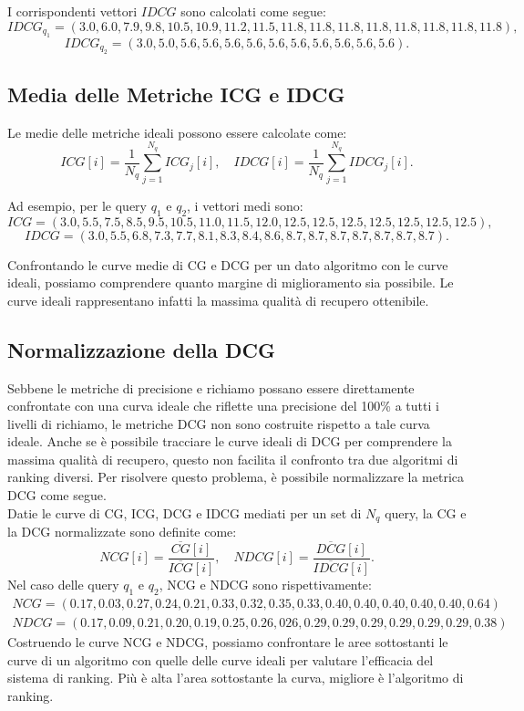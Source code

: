 \documentclass{report}
\begin{document}
	I corrispondenti vettori $IDCG$ sono calcolati come segue:
	\[
	IDCG_{q_1} = (3.0, 6.0, 7.9, 9.8, 10.5, 10.9, 11.2, 11.5, 11.8, 11.8, 11.8, 11.8, 11.8, 11.8, 11.8, 11.8),
	\]
	\[
	IDCG_{q_2} = (3.0, 5.0, 5.6, 5.6, 5.6, 5.6, 5.6, 5.6, 5.6, 5.6, 5.6, 5.6).
	\]
	
	\subsection{Media delle Metriche ICG e IDCG}
	Le medie delle metriche ideali possono essere calcolate come:
	\[
	ICG[i] = \frac{1}{N_q} \sum_{j=1}^{N_q} ICG_j[i], \quad IDCG[i] = \frac{1}{N_q} \sum_{j=1}^{N_q} IDCG_j[i].
	\]
	
	Ad esempio, per le query $q_1$ e $q_2$, i vettori medi sono:
	\[
	ICG = (3.0, 5.5, 7.5, 8.5, 9.5, 10.5, 11.0, 11.5, 12.0, 12.5, 12.5, 12.5, 12.5, 12.5, 12.5, 12.5),
	\]
	\[
	IDCG = (3.0, 5.5, 6.8, 7.3, 7.7, 8.1, 8.3, 8.4, 8.6, 8.7, 8.7, 8.7, 8.7, 8.7, 8.7, 8.7).
	\]
	
	Confrontando le curve medie di CG e DCG per un dato algoritmo con le curve ideali, possiamo comprendere quanto margine di miglioramento sia possibile. Le curve ideali rappresentano infatti la massima qualità di recupero ottenibile.
	
	\subsection{Normalizzazione della DCG}
	Sebbene le metriche di precisione e richiamo possano essere direttamente confrontate con una curva ideale che riflette una precisione del 100\% a tutti i livelli di richiamo, le metriche DCG non sono costruite rispetto a tale curva ideale. Anche se è possibile tracciare le curve ideali di DCG per comprendere la massima qualità di recupero, questo non facilita il confronto tra due algoritmi di ranking diversi. Per risolvere questo problema, è possibile normalizzare la metrica DCG come segue.
	\vspace{\baselineskip}\\
	Datie le curve di CG, ICG, DCG e IDCG mediati per un set di $N_q$ query, la CG e la DCG normalizzate sono definite come:
	\[
		NCG[i] = \frac{\overline{CG}[i]}{\overline{ICG}[i]}, \quad NDCG[i] = \frac{\overline{DCG}[i]}{\overline{IDCG}[i]}.
	\]
	Nel caso delle query $q_1$ e $q_2$, NCG e NDCG sono rispettivamente:
	\[
		\begin{array}{l}
			NCG = (0.17, 0.03, 0.27, 0.24, 0.21, 0.33, 0.32, 0.35, 0.33, 0.40, 0.40, 0.40, 0.40, 0.40, 0.64)\\
			NDCG = (0.17, 0.09, 0.21, 0.20, 0.19, 0.25, 0.26, 0
			26, 0.29, 0.29, 0.29, 0.29, 0.29, 0.29, 0.38)
		\end{array}
	\]
	Costruendo le curve NCG e NDCG, possiamo confrontare le aree sottostanti le curve di un algoritmo con quelle delle curve ideali per valutare l'efficacia del sistema di ranking. Più è alta l'area sottostante la curva, migliore è l'algoritmo di ranking.
\end{document}

